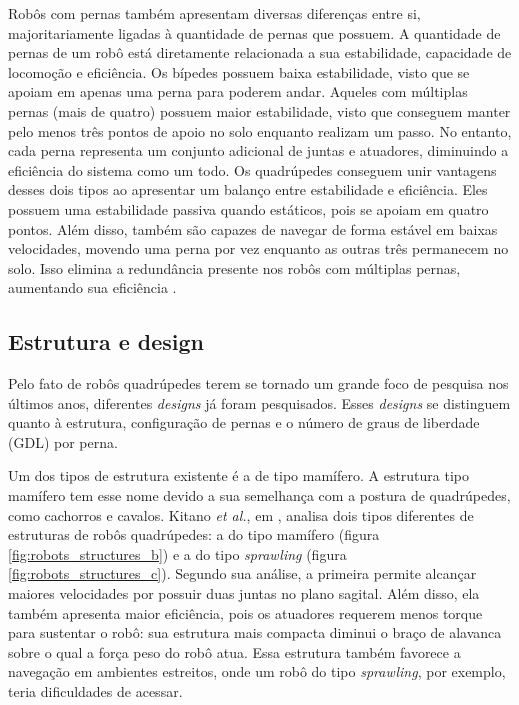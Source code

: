 \documentclass[conference]{IEEEtran}
\begin{document}
Robôs com pernas também apresentam diversas diferenças entre si, majoritariamente ligadas à quantidade de pernas que possuem. A quantidade de pernas de um robô está diretamente relacionada a sua estabilidade, capacidade de locomoção e eficiência. Os bípedes possuem baixa estabilidade, visto que se apoiam em apenas uma perna para poderem andar. Aqueles com múltiplas pernas (mais de quatro) possuem maior estabilidade, visto que conseguem manter pelo menos três pontos de apoio no solo enquanto realizam um passo. No entanto, cada perna representa um conjunto adicional de juntas e atuadores, diminuindo a eficiência do sistema como um todo. Os quadrúpedes conseguem unir vantagens desses dois tipos ao apresentar um balanço entre estabilidade e eficiência. Eles possuem uma estabilidade passiva quando estáticos, pois se apoiam em quatro pontos. Além disso, também são capazes de navegar de forma estável em baixas velocidades, movendo uma perna por vez enquanto as outras três permanecem no solo. Isso elimina a redundância presente nos robôs com múltiplas pernas, aumentando sua eficiência \cite{Yao2021}.

\subsection{Estrutura e design}
Pelo fato de robôs quadrúpedes terem se tornado um grande foco de pesquisa nos últimos anos, diferentes \textit{designs} já foram pesquisados. Esses \textit{designs} se distinguem quanto à estrutura, configuração de pernas e o número de graus de liberdade (GDL) por perna.

Um dos tipos de estrutura existente é a de tipo mamífero. A estrutura tipo mamífero tem esse nome devido a sua semelhança com a postura de quadrúpedes, como cachorros e cavalos. Kitano \textit{et al.}, em \cite{Kitano2016}, analisa dois tipos diferentes de estruturas de robôs quadrúpedes: a do tipo mamífero (figura \ref{fig:robots_structures_b}) e a do tipo \textit{sprawling} (figura \ref{fig:robots_structures_c}). Segundo sua análise, a primeira permite alcançar maiores velocidades por possuir duas juntas no plano sagital. Além disso, ela também apresenta maior eficiência, pois os atuadores requerem menos torque para sustentar o robô: sua estrutura mais compacta diminui o braço de alavanca sobre o qual a força peso do robô atua. Essa estrutura também favorece a navegação em ambientes estreitos, onde um robô do tipo \textit{sprawling}, por exemplo, teria dificuldades de acessar.
\end{document}
